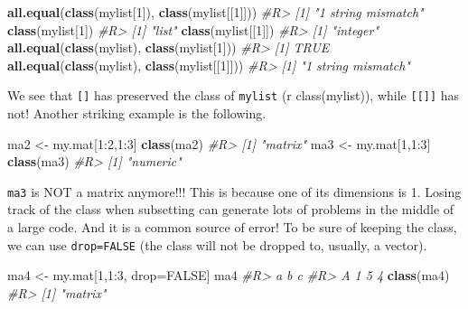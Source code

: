 \documentclass[]{book}
\newenvironment{Shaded}{}{}
\newcommand{\CommentTok}[1]{\textcolor[rgb]{0.38,0.63,0.69}{\textit{#1}}}
\newcommand{\DecValTok}[1]{\textcolor[rgb]{0.25,0.63,0.44}{#1}}
\newcommand{\KeywordTok}[1]{\textcolor[rgb]{0.00,0.44,0.13}{\textbf{#1}}}
\newcommand{\NormalTok}[1]{#1}
\newcommand{\OperatorTok}[1]{\textcolor[rgb]{0.40,0.40,0.40}{#1}}
\newcommand{\OtherTok}[1]{\textcolor[rgb]{0.00,0.44,0.13}{#1}}
\newcommand{\StringTok}[1]{\textcolor[rgb]{0.25,0.44,0.63}{#1}}
\theoremstyle{definition}
\theoremstyle{definition}
\theoremstyle{definition}
\theoremstyle{remark}
\begin{document}
\begin{Shaded}
\begin{Highlighting}[]
\KeywordTok{all.equal}\NormalTok{(}\KeywordTok{class}\NormalTok{(mylist[}\DecValTok{1}\NormalTok{]), }\KeywordTok{class}\NormalTok{(mylist[[}\DecValTok{1}\NormalTok{]]))}
\CommentTok{#R> [1] "1 string mismatch"}
\KeywordTok{class}\NormalTok{(mylist[}\DecValTok{1}\NormalTok{])}
\CommentTok{#R> [1] "list"}
\KeywordTok{class}\NormalTok{(mylist[[}\DecValTok{1}\NormalTok{]])}
\CommentTok{#R> [1] "integer"}
\KeywordTok{all.equal}\NormalTok{(}\KeywordTok{class}\NormalTok{(mylist), }\KeywordTok{class}\NormalTok{(mylist[}\DecValTok{1}\NormalTok{]))}
\CommentTok{#R> [1] TRUE}
\KeywordTok{all.equal}\NormalTok{(}\KeywordTok{class}\NormalTok{(mylist), }\KeywordTok{class}\NormalTok{(mylist[[}\DecValTok{1}\NormalTok{]]))}
\CommentTok{#R> [1] "1 string mismatch"}
\end{Highlighting}
\end{Shaded}

We see that \texttt{{[}{]}} has preserved the class of \texttt{mylist}
(r class(mylist)), while \texttt{{[}{[}{]}{]}} has not! Another striking
example is the following.

\begin{Shaded}
\begin{Highlighting}[]
\NormalTok{ma2 <-}\StringTok{ }\NormalTok{my.mat[}\DecValTok{1}\OperatorTok{:}\DecValTok{2}\NormalTok{,}\DecValTok{1}\OperatorTok{:}\DecValTok{3}\NormalTok{]}
\KeywordTok{class}\NormalTok{(ma2)}
\CommentTok{#R> [1] "matrix"}
\NormalTok{ma3 <-}\StringTok{ }\NormalTok{my.mat[}\DecValTok{1}\NormalTok{,}\DecValTok{1}\OperatorTok{:}\DecValTok{3}\NormalTok{]}
\KeywordTok{class}\NormalTok{(ma3)}
\CommentTok{#R> [1] "numeric"}
\end{Highlighting}
\end{Shaded}

\texttt{ma3} is NOT a matrix anymore!!! This is because one of its
dimensions is 1. Losing track of the class when subsetting can generate
lots of problems in the middle of a large code. And it is a common
source of error! To be sure of keeping the class, we can use
\texttt{drop=FALSE} (the class will not be dropped to, usually, a
vector).

\begin{Shaded}
\begin{Highlighting}[]
\NormalTok{ma4 <-}\StringTok{ }\NormalTok{my.mat[}\DecValTok{1}\NormalTok{,}\DecValTok{1}\OperatorTok{:}\DecValTok{3}\NormalTok{, drop=}\OtherTok{FALSE}\NormalTok{]}
\NormalTok{ma4}
\CommentTok{#R>   a b c}
\CommentTok{#R> A 1 5 4}
\KeywordTok{class}\NormalTok{(ma4)}
\CommentTok{#R> [1] "matrix"}
\end{Highlighting}
\end{Shaded}
\end{document}
